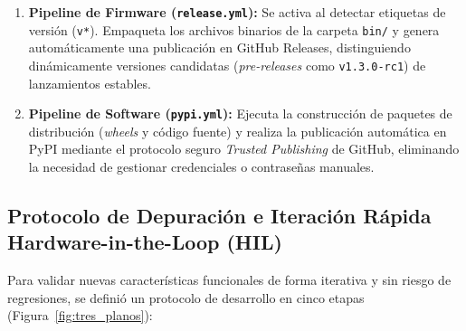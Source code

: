 \documentclass[standalone]{subfiles}
\begin{document}
\begin{enumerate}
    \item \textbf{Pipeline de Firmware (\texttt{release.yml}):} Se activa al detectar etiquetas de versión (\texttt{v*}). Empaqueta los archivos binarios de la carpeta \texttt{bin/} y genera automáticamente una publicación en GitHub Releases, distinguiendo dinámicamente versiones candidatas (\textit{pre-releases} como \texttt{v1.3.0-rc1}) de lanzamientos estables.
    
    \item \textbf{Pipeline de Software (\texttt{pypi.yml}):} Ejecuta la construcción de paquetes de distribución (\textit{wheels} y código fuente) y realiza la publicación automática en PyPI mediante el protocolo seguro \textit{Trusted Publishing} de GitHub, eliminando la necesidad de gestionar credenciales o contraseñas manuales.
\end{enumerate}

\subsection{Protocolo de Depuración e Iteración Rápida Hardware-in-the-Loop (HIL)}
\label{subsec:protocolo_hil}

Para validar nuevas características funcionales de forma iterativa y sin riesgo de regresiones, se definió un protocolo de desarrollo en cinco etapas (Figura~\ref{fig:tres_planos}):
\end{document}
